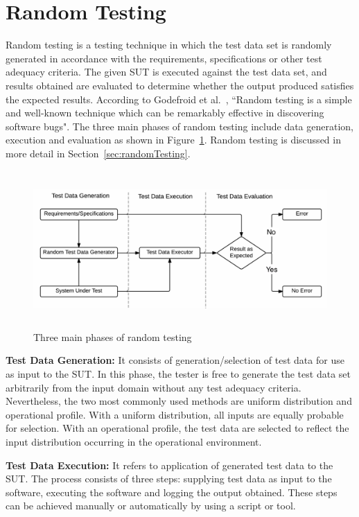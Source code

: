  

\section{Random Testing} \label{sec:RT_1}
Random testing is a testing technique in which the test data set is randomly generated in accordance with the requirements, specifications or other test adequacy criteria. The given SUT is executed against the test data set, and results obtained are evaluated to determine whether the output produced satisfies the expected results. According to Godefroid et al.~\cite{godefroid2005dart}, ``Random testing is a simple and well-known technique which can be remarkably effective in discovering software bugs". The three main phases of random testing include data generation, execution and evaluation as shown in Figure~\ref{fig:SoftwareTesting1}. Random testing is discussed in more detail in Section~\ref{sec:randomTesting}.
\bigskip
\begin{figure}[H]
	\centering
		\includegraphics[width=15cm, height=6cm ]{chapter1/randomTestingPhases1.png}
		\caption{Three main phases of random testing}
	\label{fig:SoftwareTesting1}
\end{figure}

\textbf{Test Data Generation:} It consists of generation/selection of test data for use as input to the SUT. In this phase, the tester is free to generate the test data set arbitrarily from the input domain without any test adequacy criteria. Nevertheless, the two most commonly used methods are uniform distribution and operational profile. With a uniform distribution, all inputs are equally probable for selection. With an operational profile, the test data are selected to reflect the input distribution occurring in the operational environment.

\textbf{Test Data Execution:} It refers to application of generated test data to the SUT. The process consists of three steps: supplying test data as input to the software, executing the software and logging the output obtained. 
These steps can be achieved manually or automatically by using a script or tool. 

